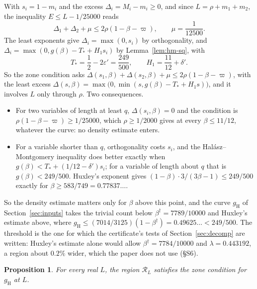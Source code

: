 \documentclass[11pt]{article}
\newtheorem{proposition}[theorem]{Proposition}
\theoremstyle{definition}
\begin{document}
With $s_i = 1 - m_i$ and the excess $\Delta_i = M_i - m_i \ge 0$, and since $L = \rho + m_1 + m_2$, the inequality $E
\le L -
1/25000$ reads
\[
  \Delta_1 + \Delta_2 + \mu \le 2\rho(1 - \beta - \varpi), \qquad \mu = \frac1{12500}.
\]
The least exponents give $\Delta_i = \max(0, s_i)$ by orthogonality, and $\Delta_i = \max(0, g(\beta) - T_* + H_1
s_i)$ by Lemma~\ref{lem:hm-sq}, with
\[
  T_* = \frac12 - 2\varepsilon' = \frac{249}{500}, \qquad H_1 = \frac{11}{12} + \delta'.
\]
So the zone condition asks $\Delta(s_1, \beta) + \Delta(s_2, \beta) + \mu \le 2\rho(1 - \beta - \varpi)$, with the
least excess $\Delta(s, \beta) = \max\bigl(0, \min(s, g(\beta) - T_* + H_1 s)\bigr)$, and it involves $L$ only through
$\rho$. Two consequences.
\begin{itemize}
\item For two variables of length at least $q$, $\Delta(s_i, \beta) = 0$ and the condition is $\rho(1 - \beta -
\varpi) \ge 1/25000$,
  which $\rho \ge 1/2000$ gives at every $\beta \le 11/12$, whatever the curve: no density estimate enters.
\item For a variable shorter than $q$, orthogonality costs $s_i$, and the Hal\'asz--Montgomery inequality does better
  exactly when $g(\beta) < T_* + (1/12 - \delta')s_i$; for a variable of length about $q$ that is $g(\beta) <
  249/500$. Huxley's exponent gives $(1 - \beta) \cdot 3/(3\beta - 1) \le 249/500$ exactly for $\beta \ge 583/749 =
  0.77837\ldots$.
\end{itemize}
So the density estimate matters only for $\beta$ above this point, and the curve $g_{\mathrm H}$ of
Section~\ref{sec:inputs} takes the trivial count below $\beta^\dagger = 7789/10000$ and Huxley's estimate above,
where $g_{\mathrm H} \le (7014/3125)(1 - \beta^\dagger) = 0.49625\ldots < 249/500$. The threshold is the one for which
the certificate's tests of Section~\ref{sec:decomp} are written: Huxley's estimate alone would allow $\beta^\dagger =
7784/10000$ and $\lambda = 0.443192$, a region about $0.2\%$ wider, which the paper does not use (\S S6).

\begin{proposition}\label{prop:region}
For every real $L$, the region $\mathcal R_L$ satisfies the zone condition for $g_{\mathrm H}$ at $L$.
\end{proposition}
\end{document}

